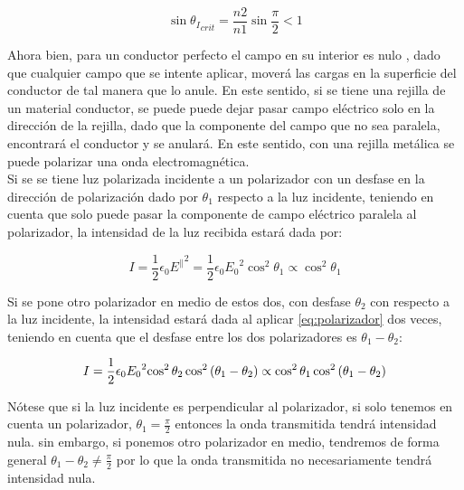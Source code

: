 \documentclass[prb,aps,twocolumn,preprintnumbers,amsmath,amssymb]{revtex4}
\begin{document}
\begin{equation}
\sin{{\theta_I}_{crit}} = \frac{n2}{n1}\sin{\frac{\pi}{2}} < 1
\label{eq:crit}
\end{equation}

Ahora bien, para un conductor perfecto el campo en su interior es nulo \cite{Griffiths}, dado que cualquier campo que se intente aplicar, moverá las cargas en la superficie del conductor de tal manera que lo anule. En este sentido, si se tiene una rejilla de un material conductor, se puede puede dejar pasar campo eléctrico solo en la dirección de la rejilla, dado que la componente del campo que no sea paralela, encontrará el conductor y se anulará. En este sentido, con una rejilla metálica se puede polarizar una onda electromagnética.\\

Si se se tiene luz polarizada incidente a un polarizador con un desfase en la dirección de polarización dado por $\theta_1$ respecto a la luz incidente, teniendo en cuenta que solo puede pasar la componente de campo eléctrico paralela al polarizador, la intensidad de la luz recibida estará dada por:

\begin{equation}
I = \frac{1}{2}\epsilon_0{E^{\parallel}}^2 = \frac{1}{2}\epsilon_0{E_0}^2{\cos^2{\theta_1}} \propto \cos^2{\theta_1}
\label{eq:polarizador}
\end{equation}

Si se pone otro polarizador en medio de estos dos, con desfase $\theta_2$ con respecto a la luz incidente, la intensidad estará dada al aplicar \ref{eq:polarizador} dos veces, teniendo en cuenta que el desfase entre los dos polarizadores es $\theta_1-\theta_2$:

\begin{equation}
\small
I = \frac{1}{2}\epsilon_0{E_0}^2{\cos^2{\theta_2}}\cos^2{ \left( \theta_1-\theta_2 \right) } \propto \cos^2{ \theta_1}\cos^2{ \left( \theta_1-\theta_2 \right) }
\label{eq:polarizador2}
\end{equation}

Nótese que si la luz incidente es perpendicular al polarizador, si solo tenemos en cuenta un polarizador, $\theta_1 = \frac{\pi}{2}$ entonces la onda transmitida tendrá intensidad nula. sin embargo, si ponemos otro polarizador en medio, tendremos de forma general $\theta_1 - \theta_2 \neq \frac{\pi}{2}$ por lo que la onda transmitida no necesariamente tendrá intensidad nula.\\
\end{document}
